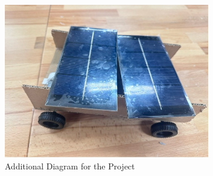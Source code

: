\documentclass[12pt]{article}
\begin{document}
\begin{figure}[h] 
    \centering 
    \includegraphics[width=0.8\textwidth]{figure/car_prototype.jpg} 
    \caption{Additional Diagram for the Project}
    \label{pic:prototype_car}
\end{figure}
\end{document}
